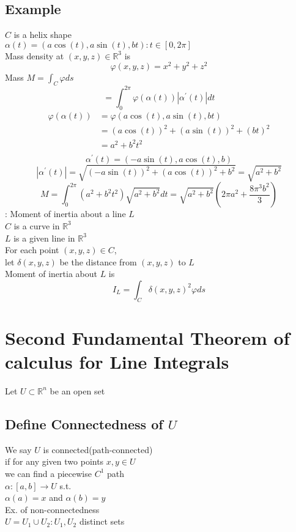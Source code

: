 \documentclass[12pt]{article}
\newcommand*\circled[1]{\tikz[baseline=(char.base)]{
    \node[shape=circle,draw,inner sep=2pt] (char) {#1};}}
\newcommand{\BR}{\mathbb R}
\newcommand{\prm}{^\prime}
\newcommand{\phii}{\varphi}
\begin{document}
  \subsection*{Example}
    $C$ is a helix shape \\
    $\alpha(t)=(a\cos(t),a\sin(t),bt): t\in[0,2\pi]$ \\
    Mass density at $(x,y,z)\in\BR^3$ is \\
    \[ \phii(x,y,z)=x^2+y^2+z^2 \]
    Mass $M=\int_C\phii ds$ \\
    \[ = \int_0^{2\pi}\phii(\alpha(t))|\alpha\prm(t)|dt \]
    \begin{align*}
      \phii(\alpha(t)) & = \phii(a\cos(t),a\sin(t),bt) \\
      & = (a\cos(t))^2+(a\sin(t))^2+(bt)^2 \\
      & = a^2+b^2t^2 \\
    \end{align*}
    \[ \alpha\prm(t)=(-a\sin(t),a\cos(t),b) \]
    \[ |\alpha\prm(t)|=\sqrt{(-a\sin(t))^2+(a\cos(t))^2+b^2}=\sqrt{a^2+b^2} \]
    \[ M=\int_0^{2\pi}(a^2+b^2t^2)\sqrt{a^2+b^2}dt=\sqrt{a^2+b^2}(2\pi a^2+\frac{8\pi^3b^2}{3}) \]
  \circled{4} : Moment of inertia about a line $L$ \\
    $C$ is a curve in $\BR^3$ \\
    $L$ is a given line in $\BR^3$ \\
    For each point $(x,y,z)\in C$, \\
    let $\delta(x,y,z)$ be the distance from $(x,y,z)$ to $L$ \\
    Moment of inertia about $L$ is \\
    \[ I_L=\int_C\delta(x,y,z)^2\phii ds \]
\section*{Second Fundamental Theorem of calculus for Line Integrals}
  Let $U\subset\BR^n$ be an open set \\
  \subsection*{Define Connectedness of $U$}
    We say $U$ is connected(path-connected) \\
    if for any given two points $x,y\in U$ \\
    we can find a piecewise $C^1$ path \\
    \indent $\alpha:[a,b]\rightarrow U$ s.t. \\
    \indent $\alpha(a)=x$ and $\alpha(b)=y$ \\
    Ex. of non-connectedness \\
    $U=U_1\cup U_2: U_1,U_2$ distinct sets \\
\end{document}
